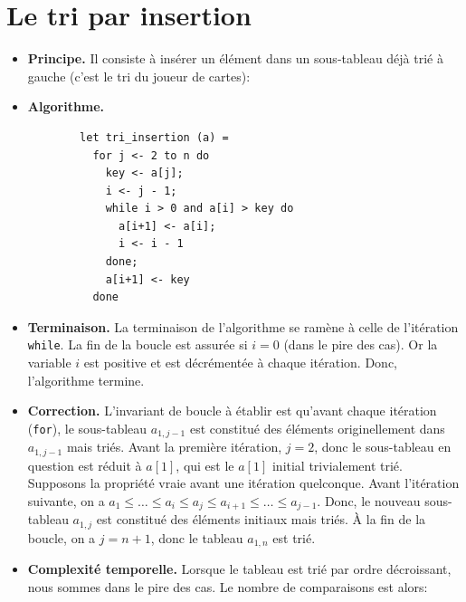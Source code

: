\documentclass[11pt,a4paper]{article}
\begin{document}
\section{Le tri par insertion}

  \begin{itemize}

    \item \textbf{Principe.} Il consiste à insérer un élément dans
          un sous-tableau déjà trié à gauche (c'est le tri du
         joueur de cartes):

    \item \textbf{Algorithme.}

      \begin{verbatim}
        let tri_insertion (a) =
          for j <- 2 to n do
            key <- a[j];
            i <- j - 1;
            while i > 0 and a[i] > key do
              a[i+1] <- a[i];
              i <- i - 1
            done;
            a[i+1] <- key
          done
      \end{verbatim}

    \item \textbf{Terminaison.} La terminaison de l'algorithme se
          ramène à celle de l'itération \verb+while+. La fin de la
          boucle est assurée si $i = 0$ (dans le pire des cas). Or la
          variable $i$ est positive et est décrémentée à chaque
          itération. Donc, l'algorithme termine.

    \item \textbf{Correction.} L'invariant de boucle à établir est
          qu'avant chaque itération (\verb+for+), le sous-tableau
          $a_{1,j-1}$ est constitué des éléments originellement dans
          $a_{1,j-1}$ mais triés. Avant la première itération, $j=2$,
          donc le sous-tableau en question est réduit à $a[1]$, qui
          est le $a[1]$ initial trivialement trié. Supposons la
          propriété vraie avant une itération quelconque. Avant
          l'itération suivante, on a $a_1 \leqslant \ldots \leqslant
          a_i \leqslant a_j \leqslant a_{i+1} \leqslant \ldots
          \leqslant a_{j-1}$. Donc, le nouveau sous-tableau $a_{1,j}$
          est constitué des éléments initiaux mais triés. À la fin de
          la boucle, on a $j = n+1$, donc le tableau $a_{1,n}$ est
          trié.

    \item \textbf{Complexité temporelle.} Lorsque le tableau est trié
          par ordre décroissant, nous sommes dans le pire des cas. Le
          nombre de comparaisons est alors:


\end{itemize}
\end{document}
